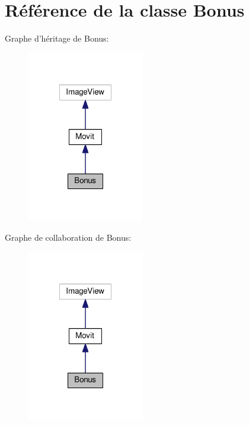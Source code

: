 \hypertarget{class_bonus}{\section{Référence de la classe Bonus}
\label{class_bonus}
}


Graphe d'héritage de Bonus\-:
\nopagebreak
\begin{figure}[H]
\begin{center}
\leavevmode
\includegraphics[width=144pt]{class_bonus__inherit__graph}
\end{center}
\end{figure}


Graphe de collaboration de Bonus\-:
\nopagebreak
\begin{figure}[H]
\begin{center}
\leavevmode
\includegraphics[width=144pt]{class_bonus__coll__graph}
\end{center}
\end{figure}
